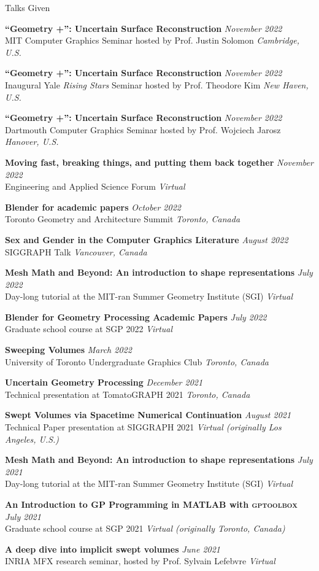 \documentclass{resume}
\newcommand{\talk}[4]{
    {\bf #1} \hfill {\em \small #2} \\ %
    {\small #3} \hfill {\em \small #4}
}
\begin{document}
\begin{rSection}{Talks Given}
\talk{``Geometry +'': Uncertain Surface Reconstruction}{November 2022}{MIT Computer Graphics Seminar hosted by Prof. Justin Solomon}{Cambridge, U.S.}

\talk{``Geometry +'': Uncertain Surface Reconstruction}{November 2022}{Inaugural Yale \textit{Rising Stars} Seminar hosted by Prof. Theodore Kim}{New Haven, U.S.}


\talk{``Geometry +'': Uncertain Surface Reconstruction}{November 2022}{Dartmouth Computer Graphics Seminar hosted by Prof. Wojciech Jarosz}{Hanover, U.S.}

\talk{Moving fast, breaking things, and putting them back together}{November 2022}{Engineering and Applied Science Forum}{Virtual}

\talk{Blender for academic papers}{October 2022}{Toronto Geometry and Architecture Summit}{Toronto, Canada}

\talk{Sex and Gender in the Computer Graphics Literature}{August 2022}{SIGGRAPH Talk}{Vancouver, Canada}

\talk{Mesh Math and Beyond: An introduction to shape representations}{July 2022}{Day-long tutorial at the MIT-ran Summer Geometry Institute (SGI)}{Virtual}

\talk{Blender for Geometry Processing Academic Papers}{July 2022}{Graduate school course at SGP 2022}{Virtual}

\talk{Sweeping Volumes}{March 2022}
{University of Toronto Undergraduate Graphics Club}{Toronto, Canada}

\talk{Uncertain Geometry Processing}{December 2021}
{Technical presentation at TomatoGRAPH 2021}{Toronto, Canada}

\talk{Swept Volumes via Spacetime Numerical Continuation}{August 2021}
{Technical Paper presentation at SIGGRAPH 2021}{Virtual (originally Los Angeles, U.S.)}

\talk{Mesh Math and Beyond: An introduction to shape representations}{July 2021}
{Day-long tutorial at the MIT-ran Summer Geometry Institute (SGI)}{Virtual}

\talk{An Introduction to GP Programming in MATLAB with \textsc{gptoolbox}}{July 2021}
{Graduate school course at SGP 2021}{Virtual (originally Toronto, Canada)}

\talk{A deep dive into implicit swept volumes}{June 2021}
{INRIA MFX research seminar, hosted by Prof. Sylvain Lefebvre}{Virtual}


\end{rSection}
\end{document}
